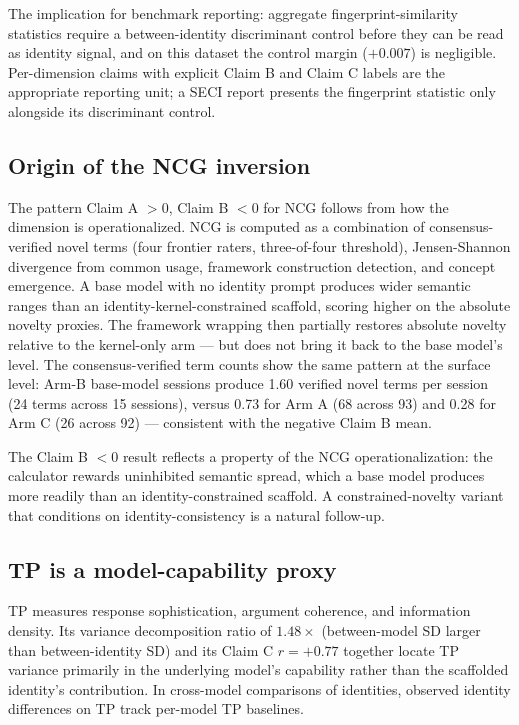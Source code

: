 \documentclass[11pt]{article}
\begin{document}
The implication for benchmark reporting: aggregate fingerprint-similarity statistics require a between-identity discriminant control before they can be read as identity signal, and on this dataset the control margin ($+0.007$) is negligible. Per-dimension claims with explicit Claim B and Claim C labels are the appropriate reporting unit; a SECI report presents the fingerprint statistic only alongside its discriminant control.

\subsection{Origin of the NCG inversion}

The pattern Claim A $>0$, Claim B $<0$ for NCG follows from how the dimension is operationalized. NCG is computed as a combination of consensus-verified novel terms (four frontier raters, three-of-four threshold), Jensen-Shannon divergence from common usage, framework construction detection, and concept emergence. A base model with no identity prompt produces wider semantic ranges than an identity-kernel-constrained scaffold, scoring higher on the absolute novelty proxies. The framework wrapping then partially restores absolute novelty relative to the kernel-only arm --- but does not bring it back to the base model's level. The consensus-verified term counts show the same pattern at the surface level: Arm-B base-model sessions produce 1.60 verified novel terms per session (24 terms across 15 sessions), versus 0.73 for Arm A (68 across 93) and 0.28 for Arm C (26 across 92) --- consistent with the negative Claim B mean.

The Claim B $<0$ result reflects a property of the NCG operationalization: the calculator rewards uninhibited semantic spread, which a base model produces more readily than an identity-constrained scaffold. A constrained-novelty variant that conditions on identity-consistency is a natural follow-up.

\subsection{TP is a model-capability proxy}

TP measures response sophistication, argument coherence, and information density. Its variance decomposition ratio of $1.48\times$ (between-model SD larger than between-identity SD) and its Claim C $r = +0.77$ together locate TP variance primarily in the underlying model's capability rather than the scaffolded identity's contribution. In cross-model comparisons of identities, observed identity differences on TP track per-model TP baselines.
\end{document}
